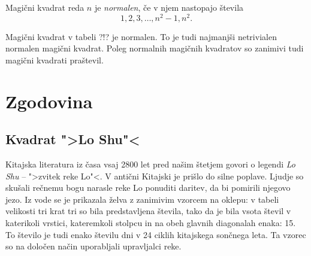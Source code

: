 \documentclass[a4paper,12pt]{article}
\newtheorem{definicija}{Definicija}
\begin{document}

   Magični kvadrat reda $n$ je \emph{normalen}, če v njem nastopajo števila
   \begin{equation}
      \label{eq:numbers}
      1, 2, 3, \ldots, n^2-1, n^2.
   \end{equation}

Magični kvadrat v tabeli ?!? je normalen.
To je tudi najmanjši netrivialen normalen magični kvadrat.
Poleg normalnih magičnih kvadratov so zanimivi tudi magični kvadrati praštevil.


\section{Zgodovina}

\subsection{Kvadrat ">Lo Shu"<}

Kitajska literatura iz časa vsaj 2800 let pred našim štetjem govori o legendi
\emph{Lo Shu} -- ">zvitek reke Lo"<. V antični Kitajski je prišlo do
silne poplave. Ljudje so skušali rečnemu bogu narasle reke Lo ponuditi daritev,
da bi pomirili njegovo jezo. Iz vode se je prikazala želva z zanimivim vzorcem
na oklepu: v tabeli velikosti tri krat tri so bila predstavljena števila, tako
da je bila vsota števil v katerikoli vrstici, kateremkoli stolpcu in na obeh
glavnih diagonalah enaka: 15. To število je tudi enako številu dni v 24 ciklih
kitajskega sončnega leta. Ta vzorec so na določen način uporabljali upravljalci
reke.

\end{document}
